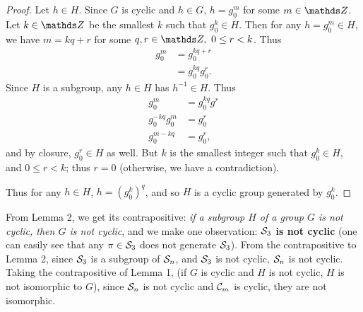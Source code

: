 \documentclass{homework}
\begin{document}
\begin{solution}
\begin{enumerate}[label=(\alph*)]
\begin{proof}[Proof]
        Let $h\in H$. Since $G$ is cyclic and $h\in G$, $h=g_0^{m}$ for some $m\in \Z$. Let $k\in
        \Z$ be the smallest $k$ such that $ g_0^{k}\in H$. Then for any $h=g_0^{m}\in H$, we have
        $m=kq+r$ for some $q,r\in \Z,\ 0\le r<k$. Thus
        \begin{align*}
          g_0^{m}&=g_0^{kq+r}\\
          &= g_0^{kq}g_0^{r}
        .\end{align*} Since $H$ is a subgroup, any $h\in H$ has $h^{-1}\in H$. Thus
        \begin{align*}
          g_0^{m}&=g_0^{kq}g^{r}\\
          g_0^{-kq}g_0^{m}&=g_0^{r}\\
          g_0^{m-kq}&=g_0^{r}
        ,\end{align*} and by closure, $ g_0^{r}\in H$ as well. But $k$ is the smallest integer such
        that $g_0^{k}\in H$, and $0\le r<k$; thus $r=0$ (otherwise, we have a contradiction).

        Thus for any $h\in H$, $h=(g_0^{k})^{q}$, and so $H$ is a cyclic group generated by $g_0^{k}$.
      \end{proof}

        From Lemma 2, we get its contrapositive: \textit{if a subgroup $H$ of a group $G$ is not
      cyclic, then $G$ is not cyclic}, and we make one observation: \textbf{$\mathcal{S}_3$ is not
      cyclic} (one can easily see that any $\pi\in \mathcal{S}_3$ does not generate $\mathcal{S}_3$). From the
      contrapositive to Lemma 2, since $\mathcal{S}_3$ is a subgroup of $\mathcal{S}_n$, and $\mathcal{S}_3$ 
      is not cyclic, $\mathcal{S}_n$ is not cyclic. Taking the contrapositive of Lemma 1, (if $G$ is cyclic
      and $H$ is not cyclic, $H$ is not isomorphic to $G$), since $ \mathcal{S}_n$ is not cyclic and
      $\mathcal{C}_m$ is cyclic, they are not isomorphic.


\end{enumerate}
\end{solution}
\end{document}
